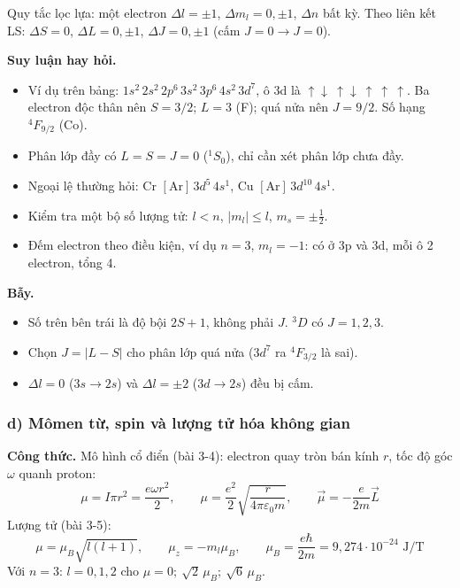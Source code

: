 \documentclass[11pt,a4paper]{article}
\begin{document}
Quy tắc lọc lựa: một electron $\Delta l=\pm1$, $\Delta m_l=0,\pm1$, $\Delta n$ bất kỳ. Theo liên kết LS: $\Delta S=0$, $\Delta L=0,\pm1$, $\Delta J=0,\pm1$ (cấm $J=0\to J=0$).

\textbf{Suy luận hay hỏi.}
\begin{itemize}
    \item Ví dụ trên bảng: $1s^2\,2s^2\,2p^6\,3s^2\,3p^6\,4s^2\,3d^7$, ô 3d là $\uparrow\downarrow\ \uparrow\downarrow\ \uparrow\ \uparrow\ \uparrow$. Ba electron độc thân nên $S=3/2$; $L=3$ (F); quá nửa nên $J=9/2$. Số hạng ${}^4F_{9/2}$ (Co).
    \item Phân lớp đầy có $L=S=J=0$ (${}^1S_0$), chỉ cần xét phân lớp chưa đầy.
    \item Ngoại lệ thường hỏi: Cr $[\mathrm{Ar}]\,3d^5\,4s^1$, Cu $[\mathrm{Ar}]\,3d^{10}\,4s^1$.
    \item Kiểm tra một bộ số lượng tử: $l<n$, $|m_l|\le l$, $m_s=\pm\frac12$.
    \item Đếm electron theo điều kiện, ví dụ $n=3$, $m_l=-1$: có ở 3p và 3d, mỗi ô 2 electron, tổng 4.
\end{itemize}

\textbf{Bẫy.}
\begin{itemize}
    \item Số trên bên trái là độ bội $2S+1$, không phải $J$. ${}^3D$ có $J=1,2,3$.
    \item Chọn $J=|L-S|$ cho phân lớp quá nửa ($3d^7$ ra ${}^4F_{3/2}$ là sai).
    \item $\Delta l=0$ ($3s\to2s$) và $\Delta l=\pm2$ ($3d\to2s$) đều bị cấm.
\end{itemize}

\subsubsection*{d) Mômen từ, spin và lượng tử hóa không gian}

\textbf{Công thức.}
Mô hình cổ điển (bài 3-4): electron quay tròn bán kính $r$, tốc độ góc $\omega$ quanh proton:
\begin{equation*}
    \mu=I\pi r^2=\frac{e\omega r^2}{2},\qquad \mu=\frac{e^2}{2}\sqrt{\frac{r}{4\pi\varepsilon_0m}},\qquad \vec\mu=-\frac{e}{2m}\vec L
\end{equation*}
Lượng tử (bài 3-5):
\begin{equation*}
    \mu=\mu_B\sqrt{l(l+1)},\qquad \mu_z=-m_l\mu_B,\qquad \mu_B=\frac{e\hbar}{2m}=9{,}274\cdot10^{-24}\text{ J/T}
\end{equation*}
Với $n=3$: $l=0,1,2$ cho $\mu=0;\ \sqrt2\,\mu_B;\ \sqrt6\,\mu_B$.
\end{document}
